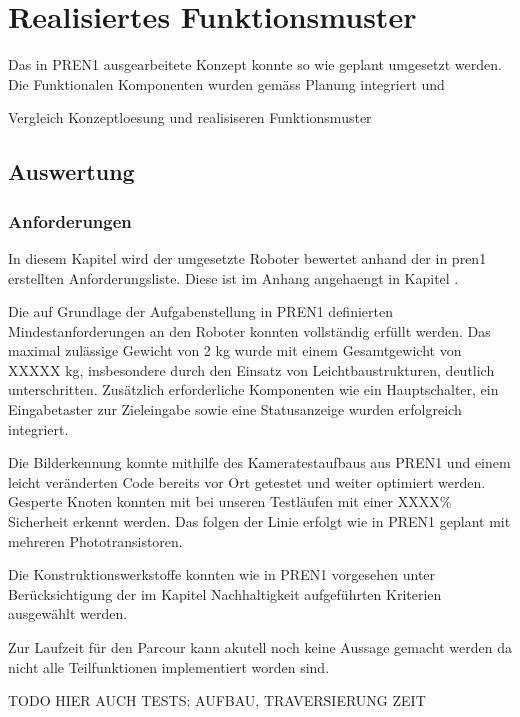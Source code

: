 \section{Realisiertes Funktionsmuster}

Das in PREN1 ausgearbeitete Konzept konnte so wie geplant umgesetzt werden. Die Funktionalen Komponenten wurden gemäss Planung integriert und 

Vergleich  Konzeptloesung und realisiseren Funktionsmuster



\subsection{Auswertung}

\subsubsection{Anforderungen}

In diesem Kapitel wird der umgesetzte Roboter bewertet anhand der in \acrshort{pren1} erstellten Anforderungsliste. Diese ist im Anhang angehaengt in Kapitel .

Die auf Grundlage der Aufgabenstellung in PREN1 definierten Mindestanforderungen an den Roboter konnten vollständig erfüllt werden. Das maximal zulässige Gewicht von 2 kg wurde mit einem Gesamtgewicht von XXXXX kg, insbesondere durch den Einsatz von Leichtbaustrukturen, deutlich unterschritten. Zusätzlich erforderliche Komponenten wie ein Hauptschalter, ein Eingabetaster zur Zieleingabe sowie eine Statusanzeige wurden erfolgreich integriert.

Die Bilderkennung konnte mithilfe des Kameratestaufbaus aus PREN1 und einem leicht veränderten Code bereits vor Ort getestet und weiter optimiert werden. Gesperte Knoten konnten mit bei unseren Testläufen mit einer XXXX\% Sicherheit erkennt werden. Das folgen der Linie erfolgt wie in PREN1 geplant mit mehreren Phototransistoren. 

Die Konstruktionswerkstoffe konnten wie in PREN1 vorgesehen unter Berücksichtigung der im Kapitel Nachhaltigkeit aufgeführten Kriterien ausgewählt werden.

Zur Laufzeit für den Parcour kann akutell noch keine Aussage gemacht werden da nicht alle Teilfunktionen implementiert worden sind. 



TODO HIER AUCH TESTS: AUFBAU, TRAVERSIERUNG ZEIT